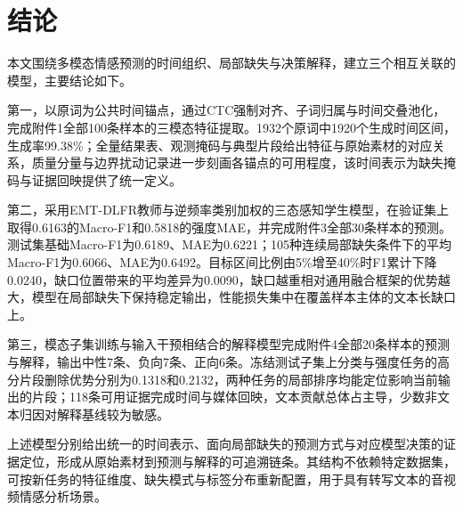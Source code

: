 \section{结论}
本文围绕多模态情感预测的时间组织、局部缺失与决策解释，建立三个相互关联的模型，主要结论如下。

第一，以原词为公共时间锚点，通过CTC强制对齐、子词归属与时间交叠池化，完成附件1全部100条样本的三模态特征提取。1932个原词中1920个生成时间区间，生成率99.38\%；全量结果表、观测掩码与典型片段给出特征与原始素材的对应关系，质量分量与边界扰动记录进一步刻画各锚点的可用程度，该时间表示为缺失掩码与证据回映提供了统一定义。

第二，采用EMT-DLFR教师与逆频率类别加权的三态感知学生模型，在验证集上取得0.6163的Macro-F1和0.5818的强度MAE，并完成附件3全部30条样本的预测。测试集基础Macro-F1为0.6189、MAE为0.6221；105种连续局部缺失条件下的平均Macro-F1为0.6066、MAE为0.6492。目标区间比例由5\%增至40\%时F1累计下降0.0240，缺口位置带来的平均差异为0.0090，缺口越重相对通用融合框架的优势越大，模型在局部缺失下保持稳定输出，性能损失集中在覆盖样本主体的文本长缺口上。

第三，模态子集训练与输入干预相结合的解释模型完成附件4全部20条样本的预测与解释，输出中性7条、负向7条、正向6条。冻结测试子集上分类与强度任务的高分片段删除优势分别为0.1318和0.2132，两种任务的局部排序均能定位影响当前输出的片段；118条可用证据完成时间与媒体回映，文本贡献总体占主导，少数非文本归因对解释基线较为敏感。

上述模型分别给出统一的时间表示、面向局部缺失的预测方式与对应模型决策的证据定位，形成从原始素材到预测与解释的可追溯链条。其结构不依赖特定数据集，可按新任务的特征维度、缺失模式与标签分布重新配置，用于具有转写文本的音视频情感分析场景。
